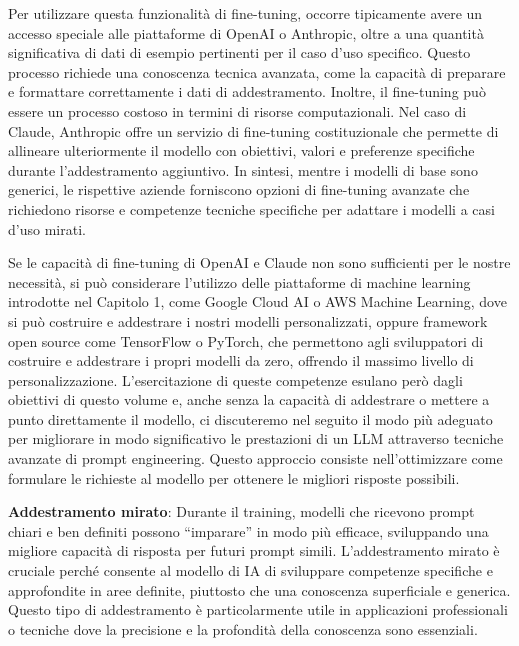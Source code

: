             Per utilizzare questa funzionalità di fine-tuning, occorre tipicamente avere un accesso speciale alle piattaforme di OpenAI o Anthropic, oltre a una quantità significativa di dati di esempio pertinenti per il caso d'uso specifico. Questo processo richiede una conoscenza tecnica avanzata, come la capacità di preparare e formattare correttamente i dati di addestramento. Inoltre, il fine-tuning può essere un processo costoso in termini di risorse computazionali. Nel caso di Claude, Anthropic offre un servizio di fine-tuning costituzionale che permette di allineare ulteriormente il modello con obiettivi, valori e preferenze specifiche durante l'addestramento aggiuntivo. In sintesi, mentre i modelli di base sono generici, le rispettive aziende forniscono opzioni di fine-tuning avanzate che richiedono risorse e competenze tecniche specifiche per adattare i modelli a casi d'uso mirati.
            
            Se le capacità di fine-tuning di OpenAI e Claude non sono sufficienti per le nostre necessità, si può considerare l'utilizzo delle piattaforme di machine learning introdotte nel Capitolo 1, come Google Cloud AI o AWS Machine Learning, dove si può costruire e addestrare i nostri modelli personalizzati, oppure framework open source come TensorFlow o PyTorch, che permettono agli sviluppatori di costruire e addestrare i propri modelli da zero, offrendo il massimo livello di personalizzazione. L'esercitazione di queste competenze esulano però dagli obiettivi di questo volume e, anche senza la capacità di addestrare o mettere a punto direttamente il modello, ci discuteremo nel seguito il modo più adeguato per migliorare in modo significativo le prestazioni di un LLM attraverso tecniche avanzate di prompt engineering. Questo approccio consiste nell'ottimizzare come formulare le richieste al modello per ottenere le migliori risposte possibili.

            \textbf{Addestramento mirato}: Durante il training, modelli che ricevono prompt chiari e ben definiti possono ``imparare'' in modo più efficace, sviluppando una migliore capacità di risposta per futuri prompt simili. L'addestramento mirato è cruciale perché consente al modello di IA di sviluppare competenze specifiche e approfondite in aree definite, piuttosto che una conoscenza superficiale e generica. Questo tipo di addestramento è particolarmente utile in applicazioni professionali o tecniche dove la precisione e la profondità della conoscenza sono essenziali.

